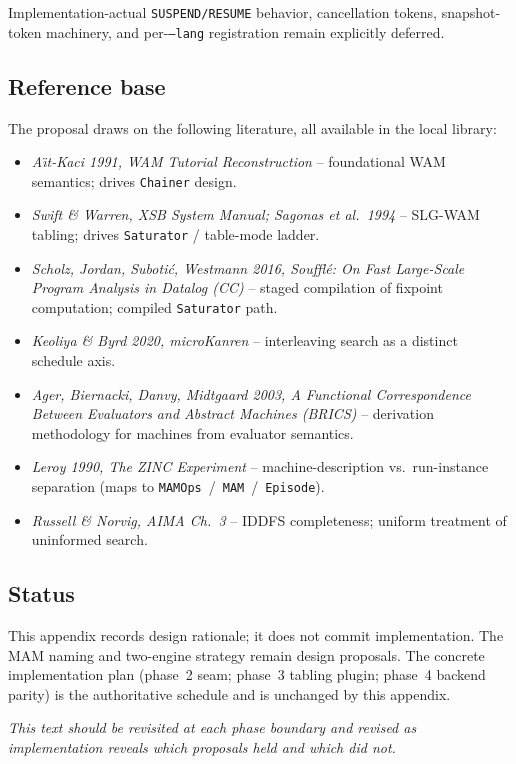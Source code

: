 \documentclass[11pt]{article}
\newcommand{\code}[1]{\texttt{#1}}
\begin{document}
Implementation-actual \code{SUSPEND/RESUME} behavior, cancellation
tokens, snapshot-token machinery, and per-\code{--lang} registration
remain explicitly deferred.

\subsection{Reference base}

The proposal draws on the following literature, all available in the
local library:

\begin{itemize}
\item \emph{A\"{\i}t-Kaci 1991, WAM Tutorial Reconstruction} --
  foundational WAM semantics; drives \code{Chainer} design.
\item \emph{Swift \& Warren, XSB System Manual; Sagonas et al.\ 1994} --
  SLG-WAM tabling; drives \code{Saturator} / table-mode ladder.
\item \emph{Scholz, Jordan, Suboti\'c, Westmann 2016, Soufflé: On Fast
  Large-Scale Program Analysis in Datalog (CC)} -- staged compilation
  of fixpoint computation; compiled \code{Saturator} path.
\item \emph{Keoliya \& Byrd 2020, microKanren} -- interleaving search
  as a distinct schedule axis.
\item \emph{Ager, Biernacki, Danvy, Midtgaard 2003, A Functional
  Correspondence Between Evaluators and Abstract Machines (BRICS)} --
  derivation methodology for machines from evaluator semantics.
\item \emph{Leroy 1990, The ZINC Experiment} -- machine-description
  vs.\ run-instance separation (maps to
  \code{MAMOps}~/~\code{MAM}~/~\code{Episode}).
\item \emph{Russell \& Norvig, AIMA Ch.~3} -- IDDFS completeness;
  uniform treatment of uninformed search.
\end{itemize}

\subsection{Status}

This appendix records design rationale; it does not commit
implementation.  The MAM naming and two-engine strategy remain
design proposals.  The concrete
implementation plan (phase~2 seam; phase~3 tabling plugin;
phase~4 backend parity) is the authoritative schedule and is
unchanged by this appendix.

\emph{This text should be revisited at each phase boundary and
revised as implementation reveals which proposals held and which
did not.}
\end{document}

